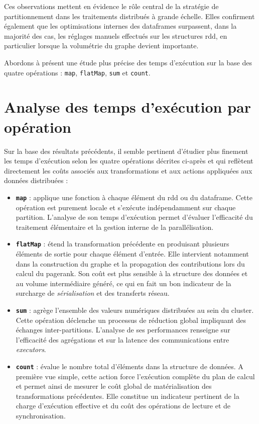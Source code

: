 \documentclass[conference]{IEEEtran}
\begin{document}
Ces observations mettent en évidence le rôle central de la stratégie de partitionnement dans les traitements distribués à grande échelle.  
Elles confirment également que les optimisations internes des \glspl{dataframe} surpassent, dans la majorité des cas, les réglages manuels effectués sur les structures \gls{rdd}, en particulier lorsque la volumétrie du graphe devient importante.

Abordons à présent une étude plus précise des temps d'exécution sur la base des quatre opérations : \texttt{map}, \texttt{flatMap}, \texttt{sum} et \texttt{count}.

\section{Analyse des temps d'exécution par opération}

Sur la base des résultats précédents, il semble pertinent d'étudier plus finement les temps d'exécution selon les quatre opérations décrites ci-après et qui reflètent directement les coûts associés aux transformations et aux actions appliquées aux données distribuées :

\begin{itemize}
    \item \textbf{\texttt{map}} : applique une fonction à chaque élément du \gls{rdd} ou du \gls{dataframe}.  
    Cette opération est purement locale et s'exécute indépendamment sur chaque partition.  
    L'analyse de son temps d'exécution permet d'évaluer l'efficacité du traitement élémentaire et la gestion interne de la parallélisation.

    \item \textbf{\texttt{flatMap}} : étend la transformation précédente en produisant plusieurs éléments de sortie pour chaque élément d'entrée.  
    Elle intervient notamment dans la construction du graphe et la propagation des contributions lors du calcul du \gls{pagerank}.  
    Son coût est plus sensible à la structure des données et au volume intermédiaire généré, ce qui en fait un bon indicateur de la surcharge de \textit{sérialisation} et des transferts réseau.

    \item \textbf{\texttt{sum}} : agrège l'ensemble des valeurs numériques distribuées au sein du \gls{cluster}.
    Cette opération déclenche un processus de réduction global impliquant des échanges inter-partitions.  
    L'analyse de ses performances renseigne sur l'efficacité des agrégations et sur la latence des communications entre \textit{executors}.

    \item \textbf{\texttt{count}} : évalue le nombre total d'éléments dans la structure de données.  
    A première vue simple, cette action force l'exécution complète du plan de calcul et permet ainsi de mesurer le coût global de matérialisation des transformations précédentes.  
    Elle constitue un indicateur pertinent de la charge d'exécution effective et du coût des opérations de lecture et de synchronisation.
\end{itemize}
\end{document}
